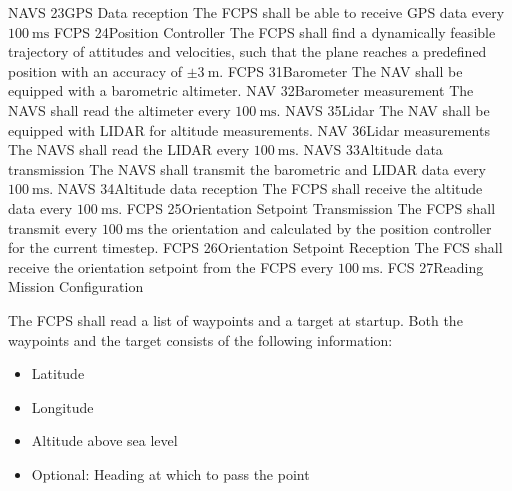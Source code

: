     {}
    {NAVS}
\req
    {23}{GPS Data reception}
    {
        The FCPS shall be able to receive GPS data every $\SI{100}{\milli\second}$
    }
    {}
    {FCPS}
\req
    {24}{Position Controller}
    {
        The FCPS shall find a dynamically feasible trajectory of
        attitudes and velocities, such that the plane reaches a 
        predefined position with an accuracy of $\pm\SI{3}{\meter}$.
    }
    {}
    {FCPS}
\req
    {31}{Barometer}
    {
        The NAV shall be equipped with a barometric altimeter. 
    }
    {}
    {NAV}
\req
    {32}{Barometer measurement}
    {
        The NAVS shall read the altimeter every $\SI{100}{\milli\second}$.
    }
    {}
    {NAVS}
\req
    {35}{Lidar}
    {
        The NAV shall be equipped with LIDAR for altitude measurements. 
    }
    {}
    {NAV}
\req
    {36}{Lidar measurements}
    {
        The NAVS shall read the LIDAR every $\SI{100}{\milli\second}$.
    }
    {}
    {NAVS}
\req
    {33}{Altitude data transmission}
    {
        The NAVS shall transmit the barometric and LIDAR data every $\SI{100}{\milli\second}$.
    }
    {}
    {NAVS}
\req
    {34}{Altitude data reception}
    {
        The FCPS shall receive the altitude data every $\SI{100}{\milli\second}$.
    }
    {}
    {FCPS}
\req
    {25}{Orientation Setpoint Transmission}
    {
        The FCPS shall transmit every $\SI{100}{\milli\second}$ 
        the orientation and calculated by the position 
        controller for the current timestep.
    }
    {}
    {FCPS}
\req
    {26}{Orientation Setpoint Reception}
    {
        The FCS shall receive the orientation setpoint from the FCPS
        every $\SI{100}{\milli\second}$.
    }
    {}
    {FCS}
\req
    {27}{Reading Mission Configuration}
    {
        The FCPS shall read a list of waypoints and a target
        at startup. Both the waypoints and the target
        consists of the following information:
        \begin{itemize}
            \item Latitude
            \item Longitude
            \item Altitude above sea level
            \item Optional: Heading at which to pass the point
        \end{itemize}
    }
    {}
